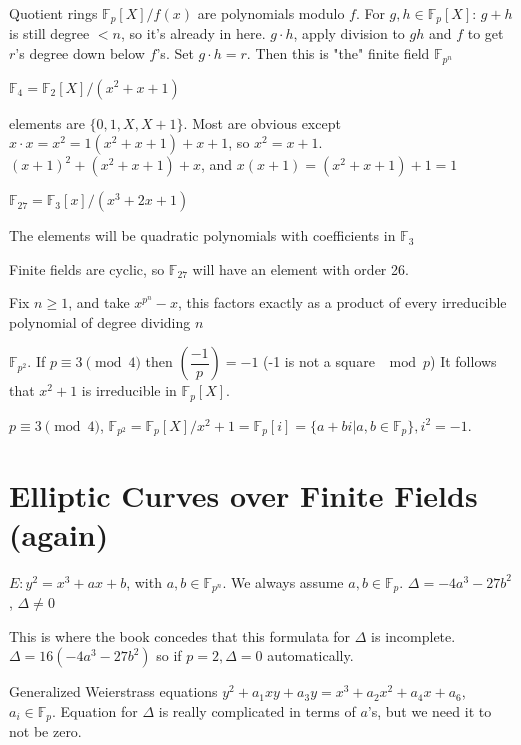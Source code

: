 \documentclass[twoside, 10pt]{article}
\newcommand{\F}{\mathbb{F}}
\begin{document}
Quotient rings $\F_p[X]/f(x)$ are polynomials modulo $f$. For $g, h\in \F_p[X]$: $g + h$ is still degree $< n$, so it's already in here. $g\cdot h$, apply division to $gh$ and $f$ to get $r$'s degree down below $f$'s. Set $g\cdot h = r$. Then this is "the" finite field $\F_{p^n}$

\begin{exm*}
    $\F_4 = \F_2[X]/(x^2 + x + 1)$
\end{exm*}
elements are $\{0, 1, X, X+1\}$. Most are obvious except $x\cdot x = x^2 = 1(x^2 + x + 1) + x + 1$, so $x^2 = x + 1$. $(x + 1)^2 + (x^2 + x + 1) + x$, and $x(x+1) = (x^2 + x + 1) + 1 = 1$

\begin{exm*}
    $\F_{27} = \F_3[x]/(x^3 + 2x + 1)$
\end{exm*}
The elements will be quadratic polynomials with coefficients in $\F_3$

\begin{rmk}
    Finite fields are cyclic, so $\F_{27}$ will have an element with order 26.
\end{rmk}

\begin{rmk}
    Fix $n \geq 1$, and take $x^{p^n}-x$, this factors exactly as a product of every irreducible polynomial of degree dividing $n$
\end{rmk}

\begin{rmk}
    $\F_{p^2}$. If $p\equiv 3\pmod{4}$ then $\left(\dfrac{-1}{p}\right) = -1$ (-1 is not a square $\mod{p}$) It follows that $x^2 + 1$ is irreducible in $\F_p[X]$.
\end{rmk}
$p \equiv 3\pmod{4}$, $\F_{p^2} = \F_p[X]/x^2 + 1 = \F_p[i] = \{a + bi | a, b \in \F_p\}, i^2 = -1$.

\section{Elliptic Curves over Finite Fields (again)}
$E: y^2 = x^3 + ax + b$, with $a, b \in \F_{p^n}$. We always assume $a, b \in \F_p$. $\Delta = -4a^3-27b^2$, $\Delta \neq 0$

This is where the book concedes that this formulata for $\Delta$ is incomplete. $\Delta = 16(-4a^3 - 27b^2)$ so if $p = 2, \Delta = 0$ automatically.

Generalized Weierstrass equations $y^2 + a_1xy + a_3y = x^3 + a_2x^2 + a_4x + a_6$, $a_i \in \F_p$. Equation for $\Delta$ is really complicated in terms of $a$'s, but we need it to not be zero.
\end{document}
